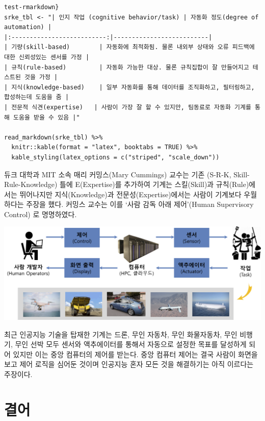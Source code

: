 \documentclass[smallextended]{svjour3}       %
\begin{document}
\begin{verbatim}
test-rmarkdown}
srke_tbl <- "| 인지 작업 (cognitive behavior/task) | 자동화 정도(degree of automation) |
|:--------------------------:|--------------------------|
| 기량(skill-based)        | 자동화에 최적화됨. 물론 내외부 상태와 오류 피드백에 대한 신뢰성있는 센서를 가정 |
| 규칙(rule-based)         | 자동화 가능한 대상. 물론 규칙집합이 잘 만들어지고 테스트된 것을 가정 |
| 지식(knowledge-based)    | 일부 자동화를 통해 데이터를 조직화하고, 필터링하고, 합성하는데 도움을 줌 |
| 전문적 식견(expertise)   | 사람이 가장 잘 할 수 있지만, 팀동료로 자동화 기계를 통해 도움을 받을 수 있음 |"

read_markdown(srke_tbl) %>% 
  knitr::kable(format = "latex", booktabs = TRUE) %>% 
  kable_styling(latex_options = c("striped", "scale_down"))
\end{verbatim}

듀크 대학과 MIT 소속 매리 커밍스(Mary Cummings) 교수는 기존 (S-R-K,
Skill- Rule-Knowledge) 틀에 E(Expertise)를 추가하여 기계는 스킬(Skill)과
규칙(Rule)에서는 뛰어나지만 지식(Knowledge)과 전문성(Expertise)에서는
사람이 기계보다 우월하다는 주장을 했다. 커밍스 교수는 이를 `사람 감독
아래 제어'(Human Supervisory Control) 로 명명하였다.

\begin{center}\includegraphics[width=0.77\linewidth]{fig/human-supervisory-control} \end{center}

최근 인공지능 기술을 탑재한 기계는 드론, 무인 자동차, 무인 화물자동차,
무인 비행기, 무인 선박 모두 센서와 액추에이터를 통해서 자동으로 설정한
목표를 달성하게 되어 있지만 이는 중앙 컴퓨터의 제어를 받는다. 중앙
컴퓨터 제어는 결국 사람이 화면을 보고 제어 로직을 심어둔 것이며 인공지능
혼자 모든 것을 해결하기는 아직 이르다는 주장이다.

\hypertarget{conclusion}{%
\section{결어}\label{conclusion}}
\end{document}
